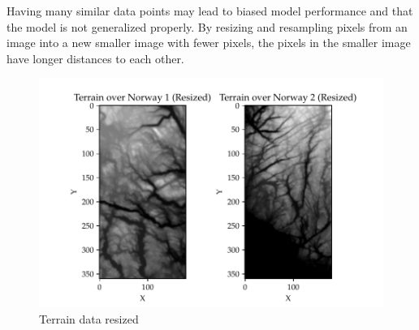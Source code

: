 \documentclass[11pt, a4paper]{article}
\begin{document}
Having many similar data points may lead to biased model performance and that the model is not generalized properly. By resizing and resampling pixels from an image
into a new smaller image with fewer pixels, the pixels in the smaller image have longer distances to each other.
\begin{figure}
  \centering
  \includegraphics[scale=0.75]{figures/EX6_terrain_data_resized.pdf}
  \caption{Terrain data resized}
  \label{fig:terrain_resized}
\end{figure}
\end{document}
